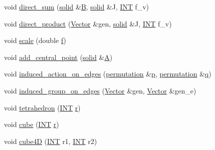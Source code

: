 \begin{DoxyCompactItemize}
\item 
void \mbox{\hyperlink{classsolid_a2045d572bdbd493c541c69624baeedbf}{direct\+\_\+sum}} (\mbox{\hyperlink{classsolid}{solid}} \&\mbox{\hyperlink{costas_8_c_ad1f767566c3189fb90e9cffcc5dd4680}{B}}, \mbox{\hyperlink{classsolid}{solid}} \&J, \mbox{\hyperlink{galois_8h_a09fddde158a3a20bd2dcadb609de11dc}{I\+NT}} f\+\_\+v)
\item 
void \mbox{\hyperlink{classsolid_a8b4527c066bcebd2e6542fe158c607b0}{direct\+\_\+product}} (\mbox{\hyperlink{class_vector}{Vector}} \&gen, \mbox{\hyperlink{classsolid}{solid}} \&J, \mbox{\hyperlink{galois_8h_a09fddde158a3a20bd2dcadb609de11dc}{I\+NT}} f\+\_\+v)
\item 
void \mbox{\hyperlink{classsolid_a26c0fc360080e87361451aaec9faa98c}{scale}} (double \mbox{\hyperlink{alphabet2_8_c_a362077c979b0bb65159c603270e40f70}{f}})
\item 
void \mbox{\hyperlink{classsolid_abec108e749250b1fbab7c8dcf98b96ae}{add\+\_\+central\+\_\+point}} (\mbox{\hyperlink{classsolid}{solid}} \&\mbox{\hyperlink{simeon_8_c_a97833f04c3a9c008df5521a2fc291bb4}{A}})
\item 
void \mbox{\hyperlink{classsolid_a372d0459fd74de947a5cb0d53ddbd6f0}{induced\+\_\+action\+\_\+on\+\_\+edges}} (\mbox{\hyperlink{classpermutation}{permutation}} \&\mbox{\hyperlink{alphabet2_8_c_a533391314665d6bf1b5575e9a9cd8552}{p}}, \mbox{\hyperlink{classpermutation}{permutation}} \&\mbox{\hyperlink{simeon_8_c_a92cbb483a3b27ae1a0dbfcb125ce216f}{q}})
\item 
void \mbox{\hyperlink{classsolid_a081dd519a288f5bf2e406ce9dc76348d}{induced\+\_\+group\+\_\+on\+\_\+edges}} (\mbox{\hyperlink{class_vector}{Vector}} \&gen, \mbox{\hyperlink{class_vector}{Vector}} \&gen\+\_\+e)
\item 
void \mbox{\hyperlink{classsolid_ad40cf6e9d27be77f0a01528442e04682}{tetrahedron}} (\mbox{\hyperlink{galois_8h_a09fddde158a3a20bd2dcadb609de11dc}{I\+NT}} \mbox{\hyperlink{alphabet2_8_c_acab531abaa74a7e664e3986f2522b33a}{r}})
\item 
void \mbox{\hyperlink{classsolid_a308e6888759550da489397527ed89137}{cube}} (\mbox{\hyperlink{galois_8h_a09fddde158a3a20bd2dcadb609de11dc}{I\+NT}} \mbox{\hyperlink{alphabet2_8_c_acab531abaa74a7e664e3986f2522b33a}{r}})
\item 
void \mbox{\hyperlink{classsolid_ab6c85f8f130a3f4409ce5fe5340fb852}{cube4D}} (\mbox{\hyperlink{galois_8h_a09fddde158a3a20bd2dcadb609de11dc}{I\+NT}} r1, \mbox{\hyperlink{galois_8h_a09fddde158a3a20bd2dcadb609de11dc}{I\+NT}} r2)
\item 

\end{DoxyCompactItemize}
